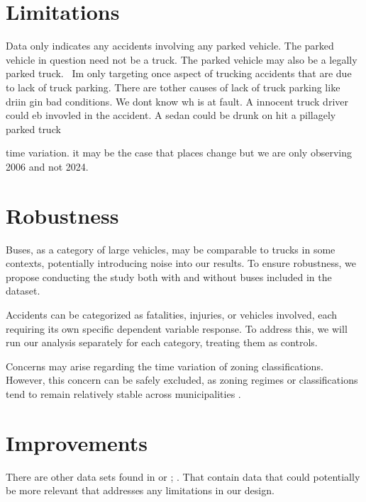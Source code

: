 \documentclass[
  12pt]{article}
\begin{document}
\hypertarget{limitations}{%
\section{\texorpdfstring{\textbf{Limitations}}{Limitations}}\label{limitations}}

Data only indicates any accidents involving any parked vehicle. The
parked vehicle in question need not be a truck. The parked vehicle may
also be a legally parked truck.~ Im only targeting once aspect of
trucking accidents that are due to lack of truck parking. There are
tother causes of lack of truck parking like driin gin bad conditions. We
dont know wh is at fault. A innocent truck driver could eb invovled in
the accident. A sedan could be drunk on hit a pillagely parked truck

time variation. it may be the case that places change but we are only
observing 2006 and not 2024.

\hypertarget{robustness}{%
\section{\texorpdfstring{\textbf{Robustness}}{Robustness}}\label{robustness}}

Buses, as a category of large vehicles, may be comparable to trucks in
some contexts, potentially introducing noise into our results. To ensure
robustness, we propose conducting the study both with and without buses
included in the dataset.

Accidents can be categorized as fatalities, injuries, or vehicles
involved, each requiring its own specific dependent variable response.
To address this, we will run our analysis separately for each category,
treating them as controls.

Concerns may arise regarding the time variation of zoning
classifications. However, this concern can be safely excluded, as zoning
regimes or classifications tend to remain relatively stable across
municipalities \citep{mclaughlinLandUseRegulation2012}.

\hypertarget{improvements}{%
\section{\texorpdfstring{\textbf{Improvements}}{Improvements}}\label{improvements}}

There are other data sets found in \citep{NHTSAFileDownloads} or
\citep{FatalityAnalysisReporting} ; . That contain data that could
potentially be more relevant that addresses any limitations in our
design.
\end{document}
